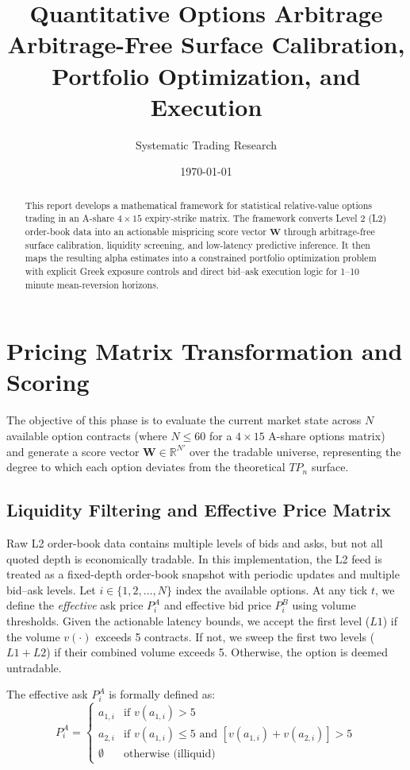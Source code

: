 \documentclass[11pt, a4paper]{article}
\title{\textbf{Quantitative Options Arbitrage}\\ \Large Arbitrage-Free Surface Calibration, Portfolio Optimization, and Execution}
\author{Systematic Trading Research}
\date{\today}
\begin{document}
\maketitle

\begin{abstract}
This report develops a mathematical framework for statistical relative-value options trading in an A-share $4 \times 15$ expiry-strike matrix. The framework converts Level 2 (L2) order-book data into an actionable mispricing score vector $\mathbf{W}$ through arbitrage-free surface calibration, liquidity screening, and low-latency predictive inference. It then maps the resulting alpha estimates into a constrained portfolio optimization problem with explicit Greek exposure controls and direct bid--ask execution logic for 1--10 minute mean-reversion horizons.
\end{abstract}

\section{Pricing Matrix Transformation and Scoring}

The objective of this phase is to evaluate the current market state across $N$ available option contracts (where $N \le 60$ for a $4 \times 15$ A-share options matrix) and generate a score vector $\mathbf{W} \in \mathbb{R}^{N'}$ over the tradable universe, representing the degree to which each option deviates from the theoretical $TP_n$ surface.

\subsection{Liquidity Filtering and Effective Price Matrix}
Raw L2 order-book data contains multiple levels of bids and asks, but not all quoted depth is economically tradable. In this implementation, the L2 feed is treated as a fixed-depth order-book snapshot with periodic updates and multiple bid--ask levels. Let $i \in \{1, 2, \dots, N\}$ index the available options. At any tick $t$, we define the \textit{effective} ask price $P^{A}_i$ and effective bid price $P^{B}_i$ using volume thresholds. Given the actionable latency bounds, we accept the first level ($L1$) if the volume $v(\cdot)$ exceeds 5 contracts. If not, we sweep the first two levels ($L1 + L2$) if their combined volume exceeds 5. Otherwise, the option is deemed untradable.

The effective ask $P^{A}_i$ is formally defined as:
\begin{equation}
P^{A}_i = \begin{cases}
a_{1,i} & \text{if } v(a_{1,i}) > 5 \\
a_{2,i} & \text{if } v(a_{1,i}) \le 5 \text{ and } \left[v(a_{1,i}) + v(a_{2,i})\right] > 5 \\
\emptyset & \text{otherwise (illiquid)}
\end{cases}
\end{equation}
\end{document}
